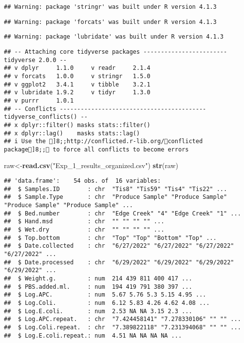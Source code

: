 \documentclass[
]{article}
\newenvironment{Shaded}{\begin{snugshade}}{\end{snugshade}}
\newcommand{\FunctionTok}[1]{\textcolor[rgb]{0.13,0.29,0.53}{\textbf{#1}}}
\newcommand{\NormalTok}[1]{#1}
\newcommand{\OtherTok}[1]{\textcolor[rgb]{0.56,0.35,0.01}{#1}}
\newcommand{\StringTok}[1]{\textcolor[rgb]{0.31,0.60,0.02}{#1}}
\begin{document}
\begin{verbatim}
## Warning: package 'stringr' was built under R version 4.1.3
\end{verbatim}

\begin{verbatim}
## Warning: package 'forcats' was built under R version 4.1.3
\end{verbatim}

\begin{verbatim}
## Warning: package 'lubridate' was built under R version 4.1.3
\end{verbatim}

\begin{verbatim}
## -- Attaching core tidyverse packages ------------------------ tidyverse 2.0.0 --
## v dplyr     1.1.0     v readr     2.1.4
## v forcats   1.0.0     v stringr   1.5.0
## v ggplot2   3.4.1     v tibble    3.2.1
## v lubridate 1.9.2     v tidyr     1.3.0
## v purrr     1.0.1     
## -- Conflicts ------------------------------------------ tidyverse_conflicts() --
## x dplyr::filter() masks stats::filter()
## x dplyr::lag()    masks stats::lag()
## i Use the ]8;;http://conflicted.r-lib.org/conflicted package]8;; to force all conflicts to become errors
\end{verbatim}

\begin{Shaded}
\begin{Highlighting}[]
\NormalTok{raw}\OtherTok{\textless{}{-}}\FunctionTok{read.csv}\NormalTok{(}\StringTok{"Exp\_1\_results\_organized.csv"}\NormalTok{)}
\FunctionTok{str}\NormalTok{(raw)}
\end{Highlighting}
\end{Shaded}

\begin{verbatim}
## 'data.frame':    54 obs. of  16 variables:
##  $ Samples.ID        : chr  "Tis8" "Tis59" "Tis4" "Tis22" ...
##  $ Sample.Type       : chr  "Produce Sample" "Produce Sample" "Produce Sample" "Produce Sample" ...
##  $ Bed.number        : chr  "Edge Creek" "4" "Edge Creek" "1" ...
##  $ Hand.msd          : chr  "" "" "" "" ...
##  $ Wet.dry           : chr  "" "" "" "" ...
##  $ Top.bottom        : chr  "Top" "Top" "Bottom" "Top" ...
##  $ Date.collected    : chr  "6/27/2022" "6/27/2022" "6/27/2022" "6/27/2022" ...
##  $ Date.processed    : chr  "6/29/2022" "6/29/2022" "6/29/2022" "6/29/2022" ...
##  $ Weight.g.         : num  214 439 811 400 417 ...
##  $ PBS.added.ml.     : num  194 419 791 380 397 ...
##  $ Log.APC.          : num  5.67 5.76 5.3 5.15 4.95 ...
##  $ Log.Coli.         : num  6.12 5.83 4.26 4.62 4.08 ...
##  $ Log.E.coli.       : num  2.53 NA NA 3.15 2.3 ...
##  $ Log.APC.repeat.   : chr  "7.424458141" "7.278330106" "" "" ...
##  $ Log.Coli.repeat.  : chr  "7.389822118" "7.231394068" "" "" ...
##  $ Log.E.coli.repeat.: num  4.51 NA NA NA NA ...
\end{verbatim}
\end{document}
